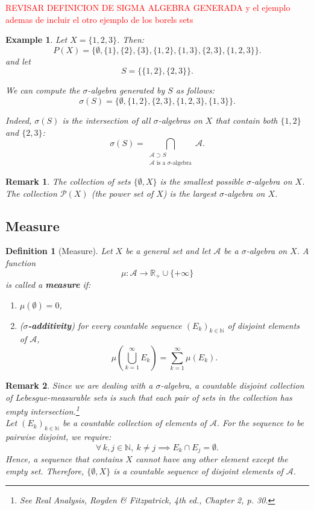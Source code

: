 \documentclass[10pt, oneside]{article}
\newenvironment{definitionbox}[1][]{\begin{defbox}\begin{defn}[#1]}{\end{defn}\end{defbox}}
\numberwithin{equation}{section}
\newtheorem{defn}{Definition}[section]
\newtheorem{rem}{Remark}
\newtheorem{example}[thm]{Example}
\begin{document}
\textcolor{red}{REVISAR DEFINICION DE SIGMA ALGEBRA GENERADA y el ejemplo ademas de incluir el otro ejemplo de los borels sets}
\begin{example}
Let $X = \{1,2,3\}$. Then:
\[
P(X) = \{\emptyset, \{1\}, \{2\}, \{3\}, \{1,2\}, \{1,3\}, \{2,3\}, \{1,2,3\}\}.
\]
and let 
\[
S = \big\{ \{1,2\}, \{2,3\} \big\}.
\]

We can compute the $\sigma$-algebra generated by $S$ as follows:
\[
\sigma(S) = \{\emptyset, \{1,2\}, \{2,3\}, \{1,2,3\}, \{1,3\}\}.
\]

Indeed, $\sigma(S)$ is the intersection of all $\sigma$-algebras on $X$ that contain both $\{1,2\}$ and $\{2,3\}$:
\[
\sigma(S) = \bigcap_{\substack{\mathcal{A} \supset S \\ \mathcal{A}\text{ is a }\sigma\text{-algebra}}} \mathcal{A}.
\]
\end{example}

\begin{rem}
The collection of sets $\{\emptyset, X\}$ is the smallest possible $\sigma$-algebra on $X$.  
The collection $\mathcal{P}(X)$ (the power set of $X$) is the largest $\sigma$-algebra on $X$.
\end{rem}

\subsection{Measure}

\begin{definitionbox}[Measure]\label{def:measure}
Let $X$ be a general set and let $\mathcal{A}$ be a $\sigma$-algebra on $X$.
A function 
\[
\mu : \mathcal{A} \to \mathbb{R}_+ \cup \{+\infty\}
\]
is called a \textbf{measure} if:
\begin{enumerate}[label=(\roman*)]
    \item $\mu(\emptyset) = 0$,
    \item (\textbf{$\sigma$-additivity}) for every countable sequence $(E_k)_{k \in \mathbb{N}}$ of disjoint elements of $\mathcal{A}$,
    \[
    \mu\!\left( \bigcup_{k=1}^{\infty} E_k \right) = \sum_{k=1}^{\infty} \mu(E_k).
    \]
\end{enumerate}
\end{definitionbox}

\begin{rem}
Since we are dealing with a $\sigma$-algebra, a countable disjoint collection of Lebesgue-measurable sets is such that each pair of sets in the collection has empty intersection.\footnote{See \textit{Real Analysis}, Royden \& Fitzpatrick, 4th ed., Chapter 2, p. 30.}\\
Let $(E_k)_{k \in \mathbb{N}}$ be a countable collection of elements of $\mathcal{A}$.
For the sequence to be pairwise disjoint, we require:
\[
\forall\, k,j \in \mathbb{N},\ k \neq j \implies E_k \cap E_j = \emptyset.
\]
Hence, a sequence that contains $X$ cannot have any other element except the empty set.
Therefore, $\{\emptyset, X\}$ is a countable sequence of disjoint elements of $\mathcal{A}$.

\end{rem}
\end{document}
